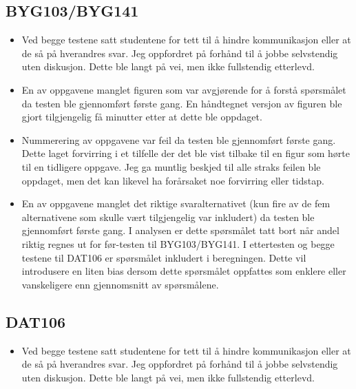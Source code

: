 \documentclass[a4paper,norsk,12pt]{article}
\begin{document}
\subsection{BYG103/BYG141}
\begin{itemize}
\item
Ved begge testene satt studentene for tett til å hindre kommunikasjon eller at de så på hverandres svar. Jeg oppfordret på forhånd til å jobbe selvstendig uten diskusjon. Dette ble langt på vei, men ikke fullstendig etterlevd.
\item
En av oppgavene manglet figuren som var avgjørende for å forstå spørsmålet da testen ble gjennomført første gang. En håndtegnet versjon av figuren ble gjort tilgjengelig få minutter etter at dette ble oppdaget.
\item
Nummerering av oppgavene var feil da testen ble gjennomført første gang. Dette laget forvirring i et tilfelle der det ble vist tilbake til en figur som hørte til en tidligere oppgave. Jeg ga muntlig beskjed til alle straks feilen ble oppdaget, men det kan likevel ha forårsaket noe forvirring eller tidstap.
\item
En av oppgavene manglet det riktige svaralternativet (kun fire av de fem alternativene som skulle vært tilgjengelig var inkludert) da testen ble gjennomført første gang. I analysen er dette spørsmålet tatt bort når andel riktig regnes ut for før-testen til BYG103/BYG141. I ettertesten og begge testene til DAT106 er spørsmålet inkludert i beregningen. Dette vil introdusere en liten bias dersom dette spørsmålet oppfattes som enklere eller vanskeligere enn gjennomsnitt av spørsmålene.
\end{itemize}

\subsection{DAT106}
\begin{itemize}
\item
Ved begge testene satt studentene for tett til å hindre kommunikasjon eller at de så på hverandres svar. Jeg oppfordret på forhånd til å jobbe selvstendig uten diskusjon. Dette ble langt på vei, men ikke fullstendig etterlevd.
\end{itemize}



\end{document}
